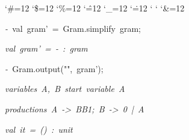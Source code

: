 \begin{list}{}
{\setlength{\leftmargin}{\leftmargini}
\setlength{\rightmargin}{0cm}
\setlength{\itemindent}{0cm}
\setlength{\listparindent}{0cm}
\setlength{\itemsep}{0cm}
\setlength{\parsep}{0cm}
\setlength{\labelsep}{0cm}
\setlength{\labelwidth}{0cm}
\catcode`\#=12
\catcode`\$=12
\catcode`\%=12
\catcode`\^=12
\catcode`\_=12
\catcode`\.=12
\catcode`
\catcode`
\catcode`\&=12
\ttfamily}
\small
\item[]\textsl{-\ }val\ gram'\ =\ Gram.simplify\ gram;
\item[]\textsl{val\ gram'\ =\ -\ :\ gram}
\item[]\textsl{-\ }Gram.output("",\ gram');
\item[]\textsl{variables\ A,\ B\ start\ variable\ A}
\item[]\textsl{productions\ A\ ->\ BB1;\ B\ ->\ 0\ |\ A}
\item[]\textsl{val\ it\ =\ ()\ :\ unit}
\end{list}
